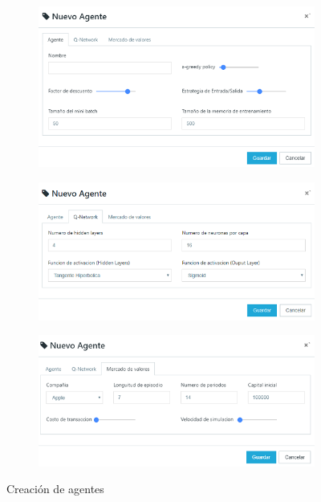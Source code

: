 \begin{figure}[h!]
	 \begin{subfigure}[b]{0.33\textwidth}
		\centering
		\includegraphics[scale=0.5]{imagenes/screen1.png}
	\end{subfigure}%
	
	 \begin{subfigure}[b]{0.33\textwidth}
		\centering
		\includegraphics[scale=0.5]{imagenes/screen2.png}
	\end{subfigure}

	 \begin{subfigure}[b]{0.33\textwidth}
		\centering
		\includegraphics[scale=0.5]{imagenes/screen3.png}
	\end{subfigure}
	
	\caption{Creación de agentes}	
\end{figure}


